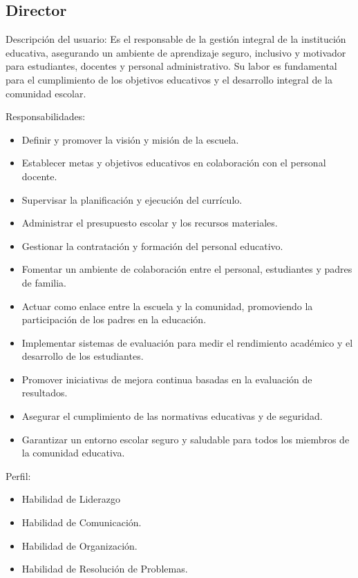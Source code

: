   \begin{Usuario}{\hypertarget{Director}{\subsection{Director}}}{
			Descripción del usuario: Es el responsable de la gestión integral de la institución educativa, asegurando un ambiente de aprendizaje seguro, inclusivo y motivador para estudiantes, docentes y personal administrativo. Su labor es fundamental para el cumplimiento de los objetivos educativos y el desarrollo integral de la comunidad escolar.
		}
		\item[Responsabilidades:] \cdtEmpty
		\begin{itemize}
			\item Definir y promover la visión y misión de la escuela.
			\item Establecer metas y objetivos educativos en colaboración con el personal docente.
            \item Supervisar la planificación y ejecución del currículo.
            \item Administrar el presupuesto escolar y los recursos materiales.
            \item Gestionar la contratación y formación del personal educativo.
            \item Fomentar un ambiente de colaboración entre el personal, estudiantes y padres de familia.
            \item Actuar como enlace entre la escuela y la comunidad, promoviendo la participación de los padres en la educación.
            \item Implementar sistemas de evaluación para medir el rendimiento académico y el desarrollo de los estudiantes.
            \item Promover iniciativas de mejora continua basadas en la evaluación de resultados.
            \item Asegurar el cumplimiento de las normativas educativas y de seguridad.
            \item Garantizar un entorno escolar seguro y saludable para todos los miembros de la comunidad educativa.
		\end{itemize}
		
		\item[Perfil:] \cdtEmpty
		\begin{itemize}
			
        \item Habilidad de Liderazgo
        \item Habilidad de Comunicación.
        \item Habilidad de Organización.
        \item Habilidad de Resolución de Problemas.


\end{itemize}
\end{Usuario}

